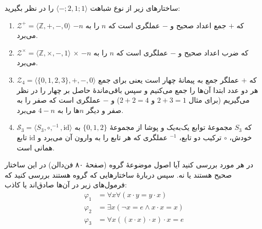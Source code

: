 ساختارهای زیر از نوع شباهت
$\langle\mathord{-};2,1;1\rangle$
را در نظر بگیرید:
\begin{enumerate}[label=(\alph*)]
    \item $\mathcal{Z^+}=\langle\mathbb{Z},+,-,0\rangle$
    که
    $+$ جمع اعداد صحیح و
    $-$ عملگری است که $n$ را به $-n$ می‌برد.
    \item $\mathcal{Z^\times}=\langle\mathbb{Z},\times,-, 1\rangle$
    $\times$ که ضرب اعداد صحیح و
    $-$ عملگری است که $n$ را به $-n$ می‌برد.
    \item $\mathcal{Z}_4=\langle\{0,1,2,3\},+,-, 0\rangle$
    که $+$ عملگر جمع به پیمانهٔ چهار است یعنی برای جمع هر دو عدد ابتدا آن‌ها را جمع می‌کنیم و سپس باقی‌ماندهٔ حاصل بر چهار را در نظر می‌گیریم
    (برای مثال
    $2+3=1$
    و
    $2+2=4$)
    و
    $-$
    عملگری است که صفر را به صفر و دیگر $n$ها را به $4-n$ می‌برد.
    \item $\mathcal{S}_3=\langle S_3, \circ,^{-1},\text{id}\rangle$
    که
    $S_3$
    مجموعهٔ توابع یک‌به‌یک و پوشا از مجموعهٔ
    $\{0,1,2\}$
    به خودش،
    $\circ$
    ترکیب دو تابع،
    $^{-1}$
    عملگری که هر تابع را به وارون آن می‌برد و
    $\text{id}$
    تابع همانی است.
\end{enumerate}
در هر مورد بررسی کنید آیا اصول موضوعهٔ گروه
(صفحهٔ ۸۰ فن‌دالن)
در این ساختار صحیح هستند یا نه. سپس دربارهٔ ساختارهایی که گروه هستند بررسی کنید که فرمول‌های زیر در آن‌ها صادق‌اند یا کاذب:
\begin{align*}
    \varphi_1 &= \forall x\forall (x\cdot y = y\cdot x) \\
    \varphi_2 &= \exists x (\neg x = e \wedge x\cdot x = x) \\
    \varphi_3 &= \forall x ((x\cdot x)\cdot x)\cdot x = e
\end{align*}